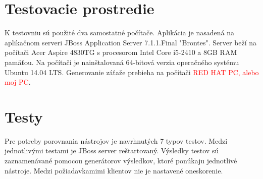 \documentclass[12pt,oneside,final]{fithesis-utf8}
\newcommand\todo[1]{\textcolor{red}{#1}}
\begin{document}
\section{Testovacie prostredie}
K testovniu sú použité dva samostatné počítače. Aplikácia je nasadená na aplikačnom serveri JBoss Application Server 7.1.1.Final "{}Brontes". Server beží na počítači Acer Aspire 4830TG s procesorom Intel Core i5-2410 a 8GB RAM pamäťou. Na počítači je nainštalovaná 64-bitová verzia operačného systému Ubuntu 14.04 LTS. Generovanie záťaže prebieha na počítači \todo{RED HAT PC, alebo moj PC}.

\newpage
\section{Testy}
Pre potreby porovnania nástrojov je navrhnutých 7 typov testov. Medzi jednotlivými testami je JBoss server reštartovaný. Výsledky testov sú zaznamenávané pomocou generátorov výsledkov, ktoré ponúkaju jednotlivé nástroje. Medzi požiadavkamimi klientov nie je nastavené oneskorenie.
\newline
\end{document}
